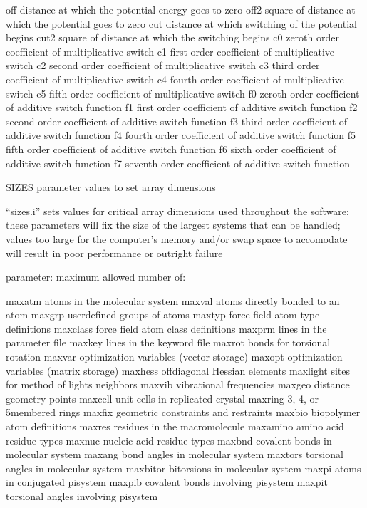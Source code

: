 \documentclass[letterpaper,11pt,english]{sphinxmanual}
\begin{document}
off     distance at which the potential energy goes to zero
off2    square of distance at which the potential goes to zero
cut     distance at which switching of the potential begins
cut2    square of distance at which the switching begins
c0      zeroth order coefficient of multiplicative switch
c1      first order coefficient of multiplicative switch
c2      second order coefficient of multiplicative switch
c3      third order coefficient of multiplicative switch
c4      fourth order coefficient of multiplicative switch
c5      fifth order coefficient of multiplicative switch
f0      zeroth order coefficient of additive switch function
f1      first order coefficient of additive switch function
f2      second order coefficient of additive switch function
f3      third order coefficient of additive switch function
f4      fourth order coefficient of additive switch function
f5      fifth order coefficient of additive switch function
f6      sixth order coefficient of additive switch function
f7      seventh order coefficient of additive switch function

SIZES   parameter values to set array dimensions

“sizes.i” sets values for critical array dimensions used throughout the software; these parameters will fix the size of the largest systems that can be handled; values too large for   the computer’s memory and/or swap space to accomodate will result in poor performance or outright failure

parameter:      maximum allowed number of:

maxatm  atoms in the molecular system
maxval  atoms directly bonded to an atom
maxgrp  user\sphinxhyphen{}defined groups of atoms
maxtyp  force field atom type definitions
maxclass        force field atom class definitions
maxprm  lines in the parameter file
maxkey  lines in the keyword file
maxrot  bonds for torsional rotation
maxvar  optimization variables (vector storage)
maxopt  optimization variables (matrix storage)
maxhess off\sphinxhyphen{}diagonal Hessian elements
maxlight        sites for method of lights neighbors
maxvib  vibrational frequencies
maxgeo  distance geometry points
maxcell unit cells in replicated crystal
maxring 3\sphinxhyphen{}, 4\sphinxhyphen{}, or 5\sphinxhyphen{}membered rings
maxfix  geometric constraints and restraints
maxbio  biopolymer atom definitions
maxres  residues in the macromolecule
maxamino        amino acid residue types
maxnuc  nucleic acid residue types
maxbnd  covalent bonds in molecular system
maxang  bond angles in molecular system
maxtors torsional angles in molecular system
maxbitor        bitorsions in molecular system
maxpi   atoms in conjugated pisystem
maxpib  covalent bonds involving pisystem
maxpit  torsional angles involving pisystem
\end{document}
